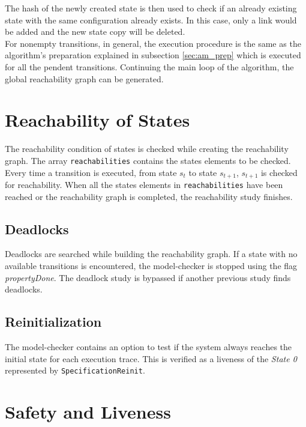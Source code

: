 \documentclass[12pt]{article}
\begin{document}
The hash of the newly created state is then used to check if an already existing state with the same configuration already exists. In this case, only a link would be added and the new state copy will be deleted.\\

For nonempty transitions, in general, the execution procedure is the same as the algorithm's preparation explained in subsection \ref{sec:am_prep} which is executed for all the pendent transitions. Continuing the main loop of the algorithm, the global reachability graph can be generated.


\section{Reachability of States}
The reachability condition of states is checked while creating the reachability graph. The array \texttt{reachabilities} contains the states elements to be checked. Every time a transition is executed, from state $s_t$ to state $s_{t+1}$, $s_{t+1}$ is checked for reachability. When all the states elements in \texttt{reachabilities} have been reached or the reachability graph is completed, the reachability study finishes.

\subsection{Deadlocks}
Deadlocks are searched while building the reachability graph. If a state with no available transitions is encountered, the model-checker is stopped using the flag \textit{propertyDone}. The deadlock study is bypassed if another previous study finds deadlocks.

\subsection{Reinitialization}
The model-checker contains an option to test if the system always reaches the initial state for each execution trace. This is verified as a liveness of the \textit{State 0} represented by \texttt{SpecificationReinit}.

\section{Safety and Liveness}
\end{document}
